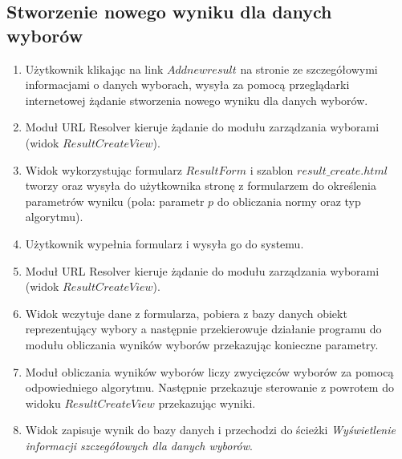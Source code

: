 \documentclass[pdflatex,11pt]{../aghdoc_version2}
\begin{document}
\subsection{Stworzenie nowego wyniku dla danych wyborów}
\begin{enumerate}
\item Użytkownik klikając na link $Add new result$ na stronie ze szczegółowymi informacjami
o danych wyborach, wysyła za pomocą przeglądarki internetowej żądanie stworzenia
nowego wyniku dla danych wyborów.
\item Moduł URL Resolver kieruje żądanie do modułu zarządzania wyborami (widok
$ResultCreateView$).
\item Widok wykorzystując formularz $ResultForm$ i szablon $result\_create.html$ tworzy oraz
wysyła do użytkownika stronę z formularzem do określenia parametrów wyniku (pola:
parametr $p$ do obliczania normy oraz typ algorytmu).
\item Użytkownik wypełnia formularz i wysyła go do systemu.
\item Moduł URL Resolver kieruje żądanie do modułu zarządzania wyborami (widok
$ResultCreateView$).
\item Widok wczytuje dane z formularza, pobiera z bazy danych obiekt reprezentujący
wybory a następnie przekierowuje działanie programu do modułu obliczania wyników
wyborów przekazując konieczne parametry.
\item Moduł obliczania wyników wyborów liczy zwycięzców wyborów za pomocą
odpowiedniego algorytmu. Następnie przekazuje sterowanie z powrotem do widoku
$ResultCreateView$ przekazując wyniki.
\item Widok zapisuje wynik do bazy danych i przechodzi do ścieżki \textit{Wyświetlenie
informacji szczegółowych dla danych wyborów}.
\end{enumerate}
\end{document}
